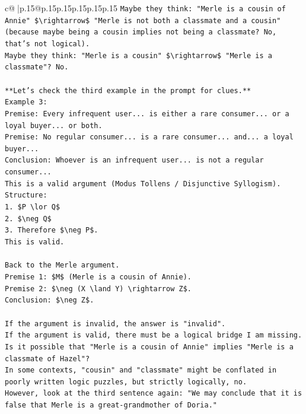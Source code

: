 \documentclass{article}
\begin{document}
{\begin{supertabular}{c@{$\;$}|p{.15\linewidth}@{}p{.15\linewidth}p{.15\linewidth}p{.15\linewidth}p{.15\linewidth}p{.15\linewidth}}
{{{\texttt{Maybe they think: "Merle is a cousin of Annie" \$\textbackslash{}rightarrow\$ "Merle is not both a classmate and a cousin" (because maybe being a cousin implies not being a classmate? No, that's not logical).} \\
\texttt{Maybe they think: "Merle is a cousin" \$\textbackslash{}rightarrow\$ "Merle is a classmate"? No.} \\
\\ 
\texttt{**Let's check the third example in the prompt for clues.**} \\
\texttt{Example 3:} \\
\texttt{Premise: Every infrequent user... is either a rare consumer... or a loyal buyer... or both.} \\
\texttt{Premise: No regular consumer... is a rare consumer... and... a loyal buyer...} \\
\texttt{Conclusion: Whoever is an infrequent user... is not a regular consumer...} \\
\texttt{This is a valid argument (Modus Tollens / Disjunctive Syllogism).} \\
\texttt{Structure:} \\
\texttt{1. \$P \textbackslash{}lor Q\$} \\
\texttt{2. \$\textbackslash{}neg Q\$} \\
\texttt{3. Therefore \$\textbackslash{}neg P\$.} \\
\texttt{This is valid.} \\
\\ 
\texttt{Back to the Merle argument.} \\
\texttt{Premise 1: \$M\$ (Merle is a cousin of Annie).} \\
\texttt{Premise 2: \$\textbackslash{}neg (X \textbackslash{}land Y) \textbackslash{}rightarrow Z\$.} \\
\texttt{Conclusion: \$\textbackslash{}neg Z\$.} \\
\\ 
\texttt{If the argument is invalid, the answer is "invalid".} \\
\texttt{If the argument is valid, there must be a logical bridge I am missing.} \\
\texttt{Is it possible that "Merle is a cousin of Annie" implies "Merle is a classmate of Hazel"?} \\
\texttt{In some contexts, "cousin" and "classmate" might be conflated in poorly written logic puzzles, but strictly logically, no.} \\
\texttt{However, look at the third sentence again: "We may conclude that it is false that Merle is a great{-}grandmother of Doria."} \\
}}}
\end{supertabular}}
\end{document}

